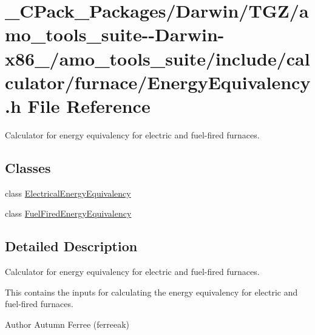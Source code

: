 \hypertarget{___c_pack___packages_2_darwin_2_t_g_z_2amo__tools__suite--_darwin-x86__64_2amo__tools__suite_2inb6155711ca9848cbd412d9755f30568a}{}\section{\+\_\+\+C\+Pack\+\_\+\+Packages/\+Darwin/\+T\+G\+Z/amo\+\_\+tools\+\_\+suite-\/-\/\+Darwin-\/x86\+\_/amo\+\_\+tools\+\_\+suite/include/calculator/furnace/\+Energy\+Equivalency.h File Reference}
\label{___c_pack___packages_2_darwin_2_t_g_z_2amo__tools__suite--_darwin-x86__64_2amo__tools__suite_2inb6155711ca9848cbd412d9755f30568a}


Calculator for energy equivalency for electric and fuel-\/fired furnaces.  


\subsection*{Classes}
\begin{DoxyCompactItemize}
\item 
class \hyperlink{class_electrical_energy_equivalency}{Electrical\+Energy\+Equivalency}
\item 
class \hyperlink{class_fuel_fired_energy_equivalency}{Fuel\+Fired\+Energy\+Equivalency}
\end{DoxyCompactItemize}


\subsection{Detailed Description}
Calculator for energy equivalency for electric and fuel-\/fired furnaces. 

This contains the inputs for calculating the energy equivalency for electric and fuel-\/fired furnaces.

\begin{DoxyAuthor}{Author}
Autumn Ferree (ferreeak) 
\end{DoxyAuthor}
